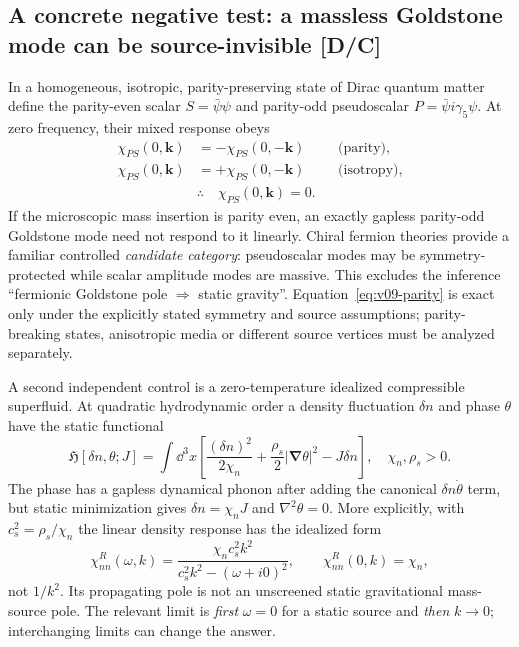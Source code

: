 \documentclass[11pt,a4paper]{article}
\begin{document}
\subsection{A concrete negative test: a massless Goldstone mode can be source-invisible [D/C]}\label{sec:v09-parity}
In a homogeneous, isotropic, parity-preserving state of Dirac quantum matter define the parity-even scalar $S=\bar\psi\psi$ and parity-odd pseudoscalar $P=\bar\psi i\gamma_5\psi$. At zero frequency, their mixed response obeys
\begin{equation}\label{eq:v09-parity}
\begin{aligned}
\chi_{PS}(0,\bm k)&=-\chi_{PS}(0,-\bm k) &&\text{(parity)},\\
\chi_{PS}(0,\bm k)&=+\chi_{PS}(0,-\bm k) &&\text{(isotropy)},\\
&\therefore\quad\boxed{\chi_{PS}(0,\bm k)=0}.&&
\end{aligned}
\end{equation}
If the microscopic mass insertion is parity even, an exactly gapless parity-odd Goldstone mode need not respond to it linearly. Chiral fermion theories provide a familiar controlled \emph{candidate category}: pseudoscalar modes may be symmetry-protected while scalar amplitude modes are massive. This excludes the inference ``fermionic Goldstone pole $\Rightarrow$ static gravity''. Equation~\eqref{eq:v09-parity} is exact only under the explicitly stated symmetry and source assumptions; parity-breaking states, anisotropic media or different source vertices must be analyzed separately.

A second independent control is a zero-temperature idealized compressible superfluid. At quadratic hydrodynamic order a density fluctuation $\delta n$ and phase $\theta$ have the static functional
\begin{equation}\label{eq:v09-hydro}
\mathfrak H[\delta n,\theta;J]=\int\dd^3x\left[\frac{(\delta n)^2}{2\chi_n}+\frac{\rho_s}{2}|\bm\nabla\theta|^2-J\delta n\right],\quad \chi_n,\rho_s>0.
\end{equation}
The phase has a gapless dynamical phonon after adding the canonical $\delta n\dot\theta$ term, but static minimization gives $\delta n=\chi_n J$ and $\nabla^2\theta=0$. More explicitly, with $c_s^2=\rho_s/\chi_n$ the linear density response has the idealized form
\begin{equation}\label{eq:v09-superfluid}
\chi_{nn}^{R}(\omega,k)=\frac{\chi_n c_s^2k^2}{c_s^2k^2-(\omega+i0)^2},\qquad
\boxed{\chi_{nn}^{R}(0,k)=\chi_n,}
\end{equation}
not $1/k^2$. Its propagating pole is not an unscreened static gravitational mass-source pole. The relevant limit is \emph{first} $\omega=0$ for a static source and \emph{then} $k\rightarrow0$; interchanging limits can change the answer.
\end{document}
